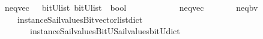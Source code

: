 \begin{isabellebody}
\isanewline
{}\isamarkupfalse%
\ neq{\isacharunderscore}vec\ \ {\isacharcolon}{\isacharcolon}\ {\isachardoublequoteopen}{\isacharparenleft}bitU{\isacharparenright}list\ {\isasymRightarrow}{\isacharparenleft}bitU{\isacharparenright}list\ {\isasymRightarrow}\ bool\ {\isachardoublequoteclose}\ \ \ \ \ \isanewline
\ \ \ \ \ {\isachardoublequoteopen}\ neq{\isacharunderscore}vec\ \ \ {\isacharequal}\ {\isacharparenleft}\ \isanewline
\ \ neq{\isacharunderscore}bv\isanewline
\ \ \ \ {\isacharparenleft}instance{\isacharunderscore}Sail{}{\isacharunderscore}values{\isacharunderscore}Bitvector{\isacharunderscore}list{\isacharunderscore}dict\isanewline
\ \ \ \ \ \ \ instance{\isacharunderscore}Sail{}{\isacharunderscore}values{\isacharunderscore}BitU{\isacharunderscore}Sail{}{\isacharunderscore}values{\isacharunderscore}bitU{\isacharunderscore}dict{\isacharparenright}\ {\isacharparenright}{\isachardoublequoteclose}\isanewline
%
\isadelimtheory
\isanewline
%
\endisadelimtheory
%
\isatagtheory
{}\isamarkupfalse%
%
\endisatagtheory
{\isafoldtheory}%
%
\isadelimtheory
%
\endisadelimtheory
%
\end{isabellebody}%
\endinput
